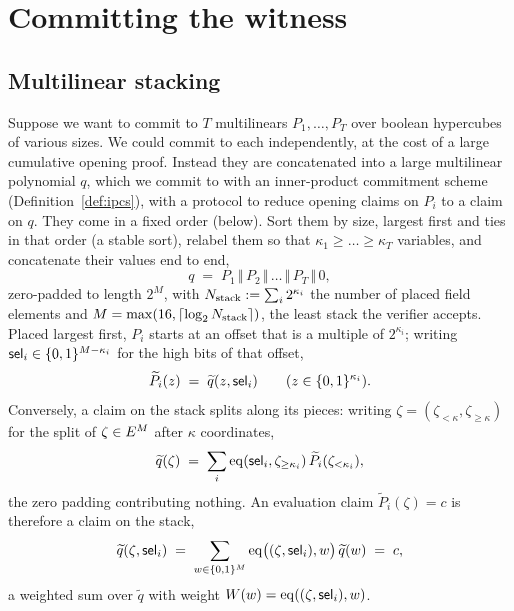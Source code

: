 \section{Committing the witness}\label{sec:rs}

\subsection{Multilinear stacking}\label{sec:stacking}

Suppose we want to commit to $T$ multilinears $P_1,\dots,P_T$ over boolean hypercubes of various sizes. We could commit to each independently, at the cost of a large cumulative opening proof. Instead they are concatenated into a large multilinear polynomial $q$, which we commit to with an inner-product commitment scheme (Definition~\ref{def:ipcs}), with a protocol to reduce opening claims on $P_i$ to a claim on $q$. They come in a fixed order (below). Sort them by size, largest first and ties in that order (a stable sort), relabel them so that $\kappa_1\ge\dots\ge\kappa_T$ variables, and concatenate their values end to end,
\[
  q \;=\; P_1 \,\Vert\, P_2 \,\Vert\,\dots\,\Vert\, P_T \,\Vert\, 0,
\]
zero-padded to length $2^{M}$, with $N_{\mathrm{stack}}:=\textstyle\sum_i 2^{\kappa_i}$ the number of placed field elements and $M=\max(16,\lceil\log_2N_{\mathrm{stack}}\rceil)$, the least stack the verifier accepts. Placed largest first, $P_i$ starts at an offset that is a multiple of $2^{\kappa_i}$; writing $\mathsf{sel}_i\in\{0,1\}^{M-\kappa_i}$ for the high bits of that offset,
\[
  \widetilde P_i(z)\;=\;\widetilde q(z,\mathsf{sel}_i)\qquad(z\in\{0,1\}^{\kappa_i}).
\]
Conversely, a claim on the stack splits along its pieces: writing $\zeta=(\zeta_{<\kappa},\zeta_{\ge\kappa})$ for the split of $\zeta\in E^{M}$ after $\kappa$ coordinates,
\begin{equation}\label{eq:stack-split}
  \widetilde q(\zeta)\;=\;\sum_i\operatorname{eq}(\mathsf{sel}_i,\zeta_{\ge\kappa_i})\,\widetilde P_i(\zeta_{<\kappa_i}),
\end{equation}
the zero padding contributing nothing. An evaluation claim $\widetilde P_i(\zeta)=c$ is therefore a claim on the stack,
\[
  \widetilde q(\zeta,\mathsf{sel}_i)\;=\;\sum_{w\in\{0,1\}^{M}}\operatorname{eq}\bigl((\zeta,\mathsf{sel}_i),w\bigr)\,\widetilde q(w)\;=\;c,
\]
a weighted sum over $\widetilde q$ with weight $W(w)=\operatorname{eq}((\zeta,\mathsf{sel}_i),w)$.

